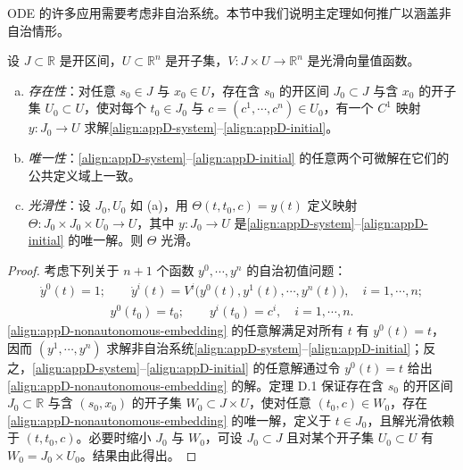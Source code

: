 \documentclass[../../main.tex]{subfiles}
\begin{document}
ODE 的许多应用需要考虑非自治系统。本节中我们说明主定理如何推广以涵盖非自治情形。

\begin{theorem}\label{theorem:appD-nonautonomous}
设 $J\subset\mathbb R$ 是开区间，$U\subset\mathbb R^n$ 是开子集，$V:J\times U\to\mathbb R^n$ 是光滑向量值函数。
\begin{enumerate}[(a)]
\item \emph{存在性}：对任意 $s_0\in J$ 与 $x_0\in U$，存在含 $s_0$ 的开区间 $J_0\subset J$ 与含 $x_0$ 的开子集 $U_0\subset U$，使对每个 $t_0\in J_0$ 与 $c=(c^1,\cdots ,c^n)\in U_0$，有一个 $C^1$ 映射 $y:J_0\to U$ 求解\eqref{align:appD-system}--\eqref{align:appD-initial}。
\item \emph{唯一性}：\eqref{align:appD-system}--\eqref{align:appD-initial} 的任意两个可微解在它们的公共定义域上一致。
\item \emph{光滑性}：设 $J_0,U_0$ 如 (a)，用 $\Theta(t,t_0,c)=y(t)$ 定义映射 $\Theta:J_0\times J_0\times U_0\to U$，其中 $y:J_0\to U$ 是\eqref{align:appD-system}--\eqref{align:appD-initial} 的唯一解。则 $\Theta$ 光滑。
\end{enumerate}
\end{theorem}

\begin{proof}
考虑下列关于 $n+1$ 个函数 $y^0,\cdots ,y^n$ 的自治初值问题：
\begin{align}\label{align:appD-nonautonomous-embedding}
\dot y^0(t)=1;\qquad
\dot y^i(t)=V^i\big(y^0(t),y^1(t),\cdots ,y^n(t)\big),\quad i=1,\cdots ,n;
\end{align}
\begin{align*}
y^0(t_0)=t_0;\qquad y^i(t_0)=c^i,\quad i=1,\cdots ,n.
\end{align*}
\eqref{align:appD-nonautonomous-embedding} 的任意解满足对所有 $t$ 有 $y^0(t)=t$，因而 $(y^1,\cdots ,y^n)$ 求解非自治系统\eqref{align:appD-system}--\eqref{align:appD-initial}；反之，\eqref{align:appD-system}--\eqref{align:appD-initial} 的任意解通过令 $y^0(t)=t$ 给出\eqref{align:appD-nonautonomous-embedding} 的解。定理 D.1 保证存在含 $s_0$ 的开区间 $J_0\subset\mathbb R$ 与含 $(s_0,x_0)$ 的开子集 $W_0\subset J\times U$，使对任意 $(t_0,c)\in W_0$，存在\eqref{align:appD-nonautonomous-embedding} 的唯一解，定义于 $t\in J_0$，且解光滑依赖于 $(t,t_0,c)$。必要时缩小 $J_0$ 与 $W_0$，可设 $J_0\subset J$ 且对某个开子集 $U_0\subset U$ 有 $W_0=J_0\times U_0$。结果由此得出。
\end{proof}
\end{document}
